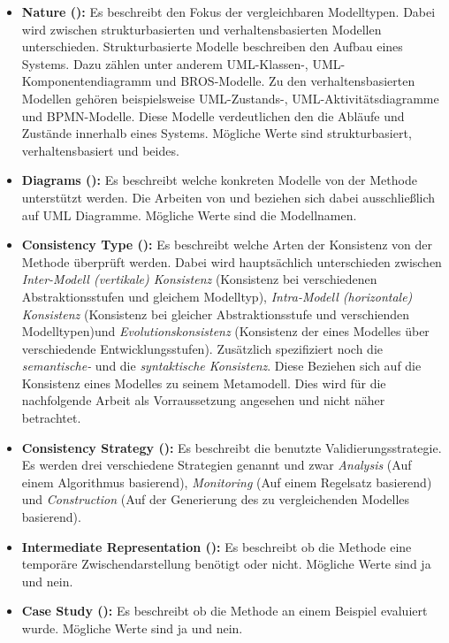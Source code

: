 \begin{itemize}
    \item \textbf{Nature (\cite{Usman2008}):} Es beschreibt den Fokus der vergleichbaren Modelltypen. Dabei wird zwischen strukturbasierten und verhaltensbasierten Modellen unterschieden. Strukturbasierte Modelle beschreiben den Aufbau eines Systems. Dazu zählen unter anderem UML-Klassen-, UML-Komponentendiagramm und BROS-Modelle. Zu den verhaltensbasierten Modellen gehören beispielsweise UML-Zustands-, UML-Aktivitätsdiagramme und BPMN-Modelle. Diese Modelle verdeutlichen den die Abläufe und Zustände innerhalb eines Systems. Mögliche Werte sind strukturbasiert, verhaltensbasiert und beides.
    \item \textbf{Diagrams (\cite{Usman2008}):} Es beschreibt welche konkreten Modelle von der Methode unterstützt werden. Die Arbeiten von \cite{Usman2008} und \cite{Lucas2009} beziehen sich dabei ausschließlich auf UML Diagramme. Mögliche Werte sind die Modellnamen.
    \item \textbf{Consistency Type (\cite{Usman2008}):} Es beschreibt welche Arten der Konsistenz von der Methode überprüft werden. Dabei wird hauptsächlich unterschieden zwischen \emph{Inter-Modell (vertikale) Konsistenz} (Konsistenz bei verschiedenen Abstraktionsstufen und gleichem Modelltyp), \emph{Intra-Modell (horizontale) Konsistenz} (Konsistenz bei gleicher Abstraktionsstufe und verschienden Modelltypen)und \emph{Evolutionskonsistenz} (Konsistenz der eines Modelles über verschiedende Entwicklungsstufen). Zusätzlich spezifiziert \cite{Usman2008} noch die \emph{semantische-} und die \emph{syntaktische Konsistenz}. Diese Beziehen sich auf die Konsistenz eines Modelles zu seinem Metamodell. Dies wird für die nachfolgende Arbeit als Vorraussetzung angesehen und nicht näher betrachtet.
    \item \textbf{Consistency Strategy (\cite{Usman2008}):} Es beschreibt die benutzte Validierungsstrategie. Es werden drei verschiedene Strategien genannt und zwar \emph{Analysis} (Auf einem Algorithmus basierend), \emph{Monitoring} (Auf einem Regelsatz basierend) und \emph{Construction} (Auf der Generierung des zu vergleichenden Modelles basierend).
    \item \textbf{Intermediate Representation (\cite{Usman2008}):} Es beschreibt ob die Methode eine temporäre Zwischendarstellung benötigt oder nicht. Mögliche Werte sind ja und nein. 
    \item \textbf{Case Study (\cite{Usman2008}):} Es beschreibt ob die Methode an einem Beispiel evaluiert wurde. Mögliche Werte sind ja und nein. 

\end{itemize}
